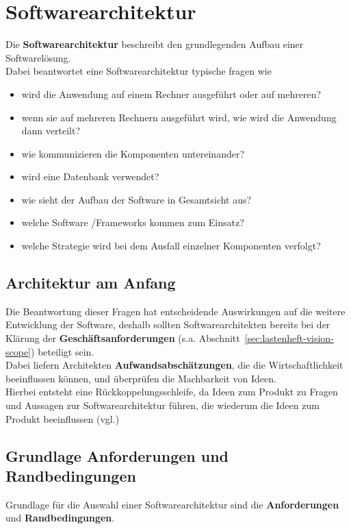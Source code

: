 \usepackage{lstmisc}\section{Softwarearchitektur}

Die \textbf{Softwarearchitektur} beschreibt den grundlegenden Aufbau einer Softwarelösung.\\

\noindent
Dabei beantwortet eine Softwarearchitektur typische fragen wie

\begin{itemize}
    \item wird die Anwendung auf einem Rechner ausgeführt oder auf mehreren?
    \item wenn sie auf mehreren Rechnern ausgeführt wird, wie wird die Anwendung dann verteilt?
    \item wie kommunizieren die Komponenten untereinander?
    \item wird eine Datenbank verwendet?
    \item wie sieht der Aufbau der Software in Gesamtsicht aus?
    \item welche Software /Frameworks kommen zum Einsatz?
    \item welche Strategie wird bei dem Ausfall einzelner Komponenten verfolgt?
\end{itemize}

\subsection*{Architektur am Anfang}
Die Beantwortung dieser Fragen hat entscheidende Auswirkungen auf die weitere Entwicklung der Software, deshalb sollten Softwarearchitekten bereits bei der Klärung der \textbf{Geschäftsanforderungen} (s.a. Abschnitt~\ref{sec:lastenheft-vision-scope}) beteiligt sein.\\

\noindent
Dabei liefern Architekten \textbf{Aufwandsabschätzungen}, die die Wirtschaftlichkeit beeinflussen können, und überprüfen die Machbarkeit von Ideen.\\
Hierbei entsteht eine Rückkoppelungsschleife, da Ideen zum Produkt zu Fragen und Aussagen zur Softwarearchitektur führen, die wiederum die Ideen zum Produkt beeinflussen (vgl.\cite[37]{Wed09b})

\subsection*{Grundlage Anforderungen und Randbedingungen}
Grundlage für die Auswahl einer Softwarearchitektur sind die \textbf{Anforderungen} und \textbf{Randbedingungen}.

